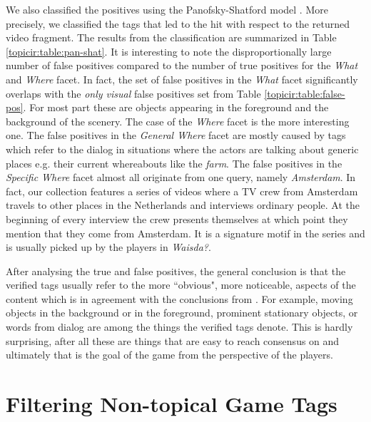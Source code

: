 We also classified the positives using the Panofsky-Shatford model \cite{laurapaper}. More precisely, we classified the tags that led to the hit with respect to the returned video fragment. The results from the classification are summarized in Table \ref{topicir:table:pan-shat}. It is interesting to note the disproportionally large number of false positives compared to the number of true positives for the \textit{What} and \textit{Where} facet. In fact, the set of false positives in the \textit{What} facet significantly overlaps with the \textit{only visual} false positives set from Table \ref{topicir:table:false-pos}. For most part these are objects appearing in the foreground and the background of the scenery. The case of the \textit{Where} facet is the more interesting one. The false positives in the \textit{General Where} facet are mostly caused by tags which refer to the dialog in situations where the actors are talking about generic places e.g. their current whereabouts like the \textit{farm}. The false positives in the \textit{Specific Where} facet almost all originate from one query, namely \textit{Amsterdam}. In fact, our collection features a series of videos where a TV crew from Amsterdam travels to other places in the Netherlands and interviews ordinary people. At the beginning of every interview the crew presents themselves at which point they mention that they come from Amsterdam. It is a signature motif in the series and is usually picked up by the players in \textit{Waisda?}. %

After analysing the true and false positives, the general conclusion is that the verified tags usually refer to the more ``obvious", more noticeable, aspects of the content which is in agreement with the conclusions from \cite{DBLP:conf/chi/RobertsonVW09,Jain:2013:GAE:2399187.2399190}. For example, moving objects in the background or in the foreground, prominent stationary objects, or words from dialog are among the things the verified tags denote. This is hardly surprising, after all these are things that are easy to reach consensus on and ultimately that is the goal of the game from the perspective of the players. 

\section{Filtering Non-topical Game Tags}\label{sec:topicir-filter:filtering}

